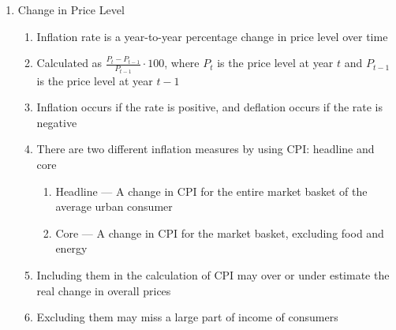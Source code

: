 \documentclass[12pt]{article}
\begin{document}
\begin{enumerate}
\begin{enumerate}
\begin{enumerate}
\begin{enumerate}
                \end{enumerate}

            \end{enumerate}

        \end{enumerate}

      \item Change in Price Level

        \begin{enumerate}

          \item Inflation rate is a year-to-year percentage change in price level over time

          \item Calculated as $\frac{P_t-P_{t-1}}{P_{t-1}}\cdot100$, where $P_t$ is the price level at year $t$ and $P_{t-1}$ is the price level at year $t-1$

          \item Inflation occurs if the rate is positive, and deflation occurs if the rate is negative

          \item There are two different inflation measures by using CPI: headline and core

            \begin{enumerate}

              \item Headline — A change in CPI for the entire market basket of the average urban consumer

              \item Core — A change in CPI for the market basket, excluding food and energy

            \end{enumerate}

          \item Including them in the calculation of CPI may over or under estimate the real change in overall prices

          \item Excluding them may miss a large part of income of consumers

        \end{enumerate}

    \end{enumerate}
\end{document}
